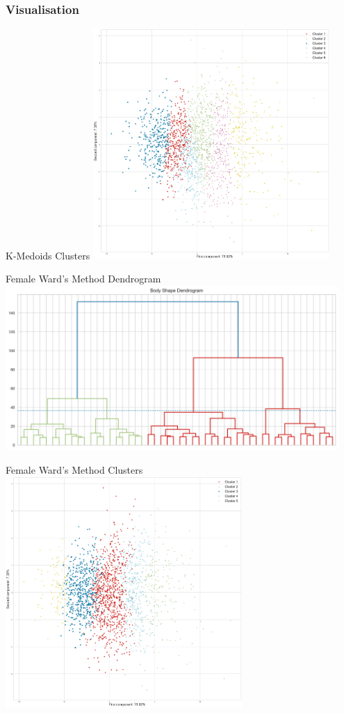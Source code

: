 \documentclass[10pt]{beamer}
\begin{document}
\subsubsection{Visualisation}
\begin{frame}{K-Medoids Clusters}
	\centering
	\includegraphics[width=0.675\textwidth]{../Images/FMedoidsProjection.png}
\end{frame}

\begin{frame}{Female Ward's Method Dendrogram}
	\centering
	\includegraphics[width=0.95\textwidth]{../Images/FDendrogram.png}
\end{frame}

\begin{frame}{Female Ward's Method Clusters}
	\centering
	\includegraphics[width=0.675\textwidth]{../Images/FHierProjection.png}
\end{frame}
\end{document}
